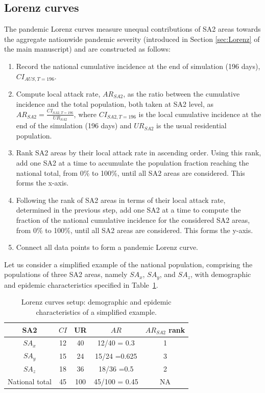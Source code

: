 \documentclass{article}
\begin{document}
\begin{appendices}
\section{Lorenz curves}
\label{sec_supp:lorenz}
The pandemic Lorenz curves measure unequal contributions of SA2 areas towards the aggregate nationwide pandemic severity (introduced in Section \ref{sec:Lorenz} of the main manuscript) and are constructed as follows:
\begin{enumerate}
    \item Record the national cumulative incidence at the end of  simulation (196 days), $CI_{AUS,T=196}$.
    \item Compute local attack rate, $AR_{SA2}$, as the ratio between the cumulative incidence and the total population, both taken at SA2 level,  as $AR_{SA2}=\frac{CI_{SA2,T=196}}{UR_{SA2}}$, where $CI_{SA2, T=196}$ is the local cumulative incidence at the end of the simulation (196 days) and $UR_{SA2}$ is the usual residential population.
    \item Rank SA2 areas by their local attack rate in ascending order. Using this rank, add one SA2 at a time to accumulate the population fraction reaching the national total, from 0\% to 100\%, until all SA2 areas are considered. This forms the x-axis. 
    \item Following the rank of SA2 areas in terms of their local attack rate, determined in the previous step, add one SA2 at a time to compute the fraction of the national cumulative incidence for the considered SA2 areas, from 0\% to 100\%, until all SA2 areas are considered. This forms the y-axis.
    \item Connect all data points to form a pandemic Lorenz curve.
\end{enumerate}

Let us consider a simplified example of the national population, comprising the populations of three SA2 areas, namely $SA_x$, $SA_y$, and $SA_z$, with demographic and epidemic characteristics specified in Table~\ref{tab:lorenz_dummy}.

\renewcommand{\arraystretch}{1.1}
\begin{table}[hb]
\centering
    \begin{tabular}{c|c|c|c|c}
    \hline
    SA2 & $CI$ & UR & $AR$ & $AR_{SA2}$ rank\\
    \hline \hline 
         $SA_x$ & 12 & 40 & 12/40 = 0.3 & 1 \\
         $SA_y$ & 15 & 24 & 15/24  =0.625 & 3\\
         $SA_z$ & 18 & 36 & 18/36  =0.5 & 2\\
         National total  & 45 & 100 & 45/100 = 0.45 & NA \\
         \hline
    \end{tabular}
     \caption{Lorenz curves setup: demographic and epidemic characteristics of a simplified example.}
     \label{tab:lorenz_dummy}
\end{table}


\end{appendices}
\end{document}
